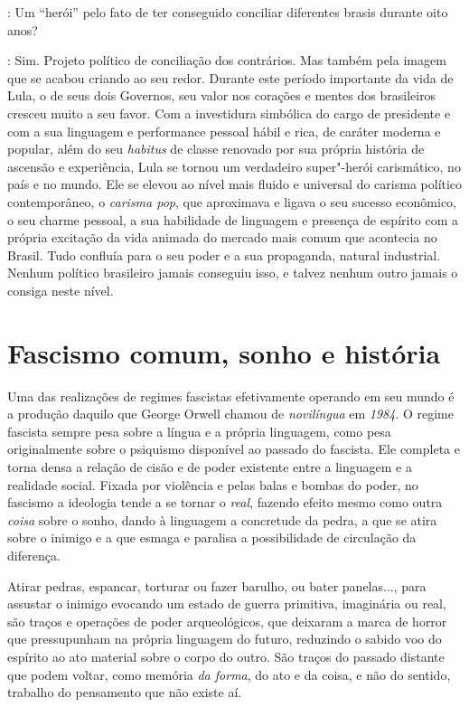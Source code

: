 \smallskip

\noindent{}: Um ``herói'' pelo fato de ter conseguido conciliar diferentes brasis
durante oito anos?

\noindent{}: Sim. Projeto político de conciliação dos contrários. Mas também pela
imagem que se acabou criando ao seu redor. Durante este período
importante da vida de Lula, o de seus dois Governos, seu valor nos
corações e mentes dos brasileiros cresceu muito a seu favor. Com a
investidura simbólica do cargo de presidente e com a sua linguagem e
performance pessoal hábil e rica, de caráter moderna e popular, além do
seu \emph{habitus} de classe renovado por sua própria história de
ascensão e experiência, Lula se tornou um verdadeiro super"-herói
carismático, no país e no mundo. Ele se elevou ao nível mais fluido e
universal do carisma político contemporâneo, o \emph{carisma pop}, que
aproximava e ligava o seu sucesso econômico, o seu charme pessoal, a sua
habilidade de linguagem e presença de espírito com a própria excitação
da vida animada do mercado mais comum que acontecia no Brasil. Tudo
confluía para o seu poder e a sua propaganda, natural industrial. Nenhum
político brasileiro jamais conseguiu isso, e talvez nenhum outro jamais
o consiga neste nível.

\chapter{Fascismo comum, sonho e história}

Uma das realizações de regimes fascistas efetivamente operando em seu
mundo é a produção daquilo que George Orwell chamou de \emph{novilíngua}
em \emph{1984}. O regime fascista sempre pesa sobre a
língua e a própria linguagem, como pesa originalmente sobre o psiquismo
disponível ao passado do fascista. Ele completa e torna densa a relação
de cisão e de poder existente entre a linguagem e a realidade social.
Fixada por violência e pelas balas e bombas do poder, no fascismo a
ideologia tende a se tornar o \emph{real}, fazendo efeito mesmo como
outra \emph{coisa} sobre o sonho, dando à linguagem a concretude da
pedra, a que se atira sobre o inimigo e a que esmaga e paralisa a
possibilidade de circulação da diferença.

Atirar pedras, espancar, torturar ou fazer barulho, ou bater panelas...,
para assustar o inimigo evocando um estado de guerra primitiva,
imaginária ou real, são traços e operações de poder arqueológicos, que
deixaram a marca de horror que pressupunham na própria linguagem do
futuro, reduzindo o sabido voo do espírito ao ato material sobre o corpo
do outro. São traços do passado distante que podem voltar, como memória
\emph{da forma}, do ato e da coisa, e não do sentido, trabalho do
pensamento que não existe aí.

